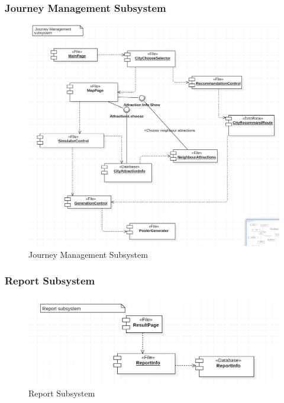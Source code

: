 \documentclass[10pt]{article}
\begin{document}
\subsubsection{Journey Management Subsystem}
\begin{figure}[H]
    \centering
    
    \includegraphics[width=14cm]{journeybefore.png}
    \caption{Journey Management Subsystem}
    \label{Journey Management Subsystem}
\end{figure}

\subsubsection{Report Subsystem}
\begin{figure}[H]
    \centering
    
    \includegraphics[width=14cm]{reportbefore.png}
    \caption{Report Subsystem}
    \label{Report Subsystem}
\end{figure}
\end{document}
